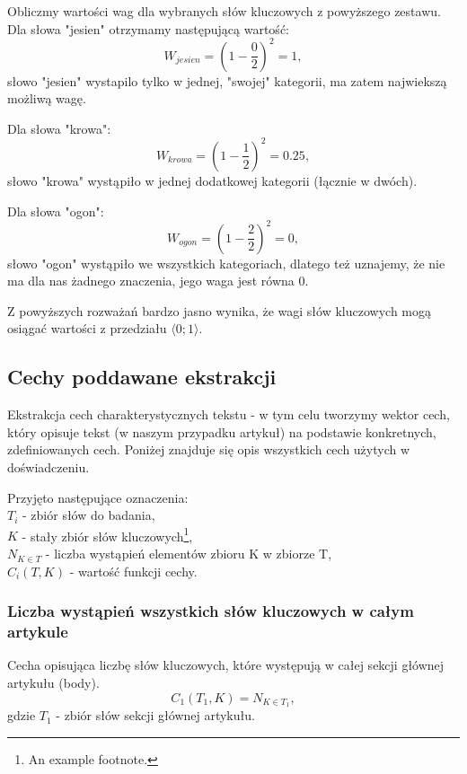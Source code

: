 \documentclass{classrep}
\begin{document}
Obliczmy wartości wag dla wybranych słów kluczowych z powyższego zestawu. Dla słowa "jesien" otrzymamy następującą wartość:
\begin{equation}
            W_{jesien} = \left({1 - \frac{0}{2}}\right)^2 = 1,
\end{equation}
słowo "jesien" wystapilo tylko w jednej, "swojej" kategorii, ma zatem najwiekszą możliwą wagę.

Dla słowa "krowa":
\begin{equation}
            W_{krowa} = \left({1 - \frac{1}{2}}\right)^2 = 0.25,
\end{equation}
słowo "krowa" wystąpiło w jednej dodatkowej kategorii (łącznie w dwóch).

Dla słowa "ogon":
\begin{equation}
            W_{ogon} = \left({1 - \frac{2}{2}}\right)^2 = 0,
\end{equation}
słowo "ogon" wystąpiło we wszystkich kategoriach, dlatego też uznajemy, że nie ma dla nas żadnego znaczenia, jego waga jest równa 0. \newline

Z powyższych rozważań bardzo jasno wynika, że wagi słów kluczowych mogą osiągać wartości z przedziału $ \langle0;1\rangle $.


\subsection{Cechy poddawane ekstrakcji}

 Ekstrakcja cech charakterystycznych tekstu - w tym celu tworzymy wektor cech, który opisuje tekst (w naszym przypadku artykuł) na podstawie konkretnych, zdefiniowanych cech. Poniżej znajduje się opis wszystkich cech użytych w doświadczeniu. \newline

Przyjęto następujące oznaczenia:\\
    \quad $T_{i}$ - zbiór słów do badania,\\
    \quad $K$ - stały zbiór słów kluczowych\footnote{An example footnote.}, \\
    \quad $N_{K \in T}$ - liczba wystąpień elementów zbioru K w zbiorze T, \\
    \quad $C_{i}(T,K)$ - wartość funkcji cechy. \\


\subsubsection{Liczba wystąpień wszystkich słów kluczowych w całym artykule}
Cecha opisująca liczbę słów kluczowych, które występują w całej sekcji głównej artykułu (body).
\begin{equation}
            C_{1}(T_{1},K) = N_{K \in T_{1}},
 \end{equation}	
 gdzie $T_{1}$ - zbiór słów sekcji głównej artykułu.
\end{document}
